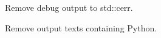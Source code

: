 
\begin{DoxyRefList}
\item[Class \mbox{\hyperlink{class_par_exe}{Par\+Exe}} ]\label{todo__todo000001}%
%
Remove debug output to std\+::cerr. 

Remove output texts containing Python. 
\end{DoxyRefList}